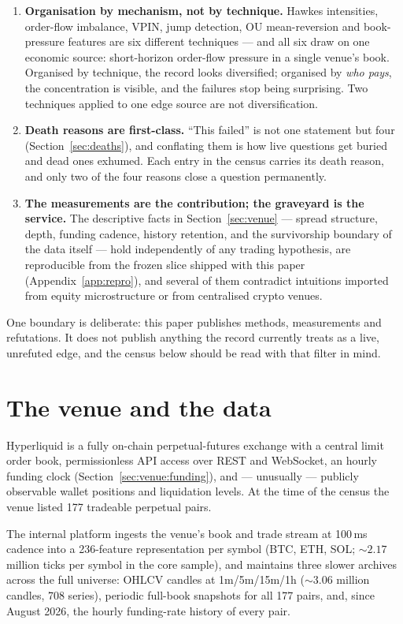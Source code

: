 \documentclass[11pt,a4paper]{article}
\begin{document}
\begin{enumerate}
\item \textbf{Organisation by mechanism, not by technique.} Hawkes
intensities, order-flow imbalance, VPIN, jump detection, OU
mean-reversion and book-pressure features are six different techniques
--- and all six draw on one economic source: short-horizon order-flow
pressure in a single venue's book. Organised by technique, the record
looks diversified; organised by \emph{who pays}, the concentration is
visible, and the failures stop being surprising. Two techniques applied
to one edge source are not diversification.
\item \textbf{Death reasons are first-class.} ``This failed'' is not
one statement but four (Section~\ref{sec:deaths}), and conflating them
is how live questions get buried and dead ones exhumed. Each entry in
the census carries its death reason, and only two of the four reasons
close a question permanently.
\item \textbf{The measurements are the contribution; the graveyard is
the service.} The descriptive facts in Section~\ref{sec:venue} ---
spread structure, depth, funding cadence, history retention, and the
survivorship boundary of the data itself --- hold independently of any
trading hypothesis, are reproducible from the frozen slice shipped with
this paper (Appendix~\ref{app:repro}), and several of them contradict
intuitions imported from equity microstructure or from centralised
crypto venues.
\end{enumerate}

One boundary is deliberate: this paper publishes methods, measurements
and refutations. It does not publish anything the record currently
treats as a live, unrefuted edge, and the census below should be read
with that filter in mind.

\section{The venue and the data}
\label{sec:data}

Hyperliquid is a fully on-chain perpetual-futures exchange with a
central limit order book, permissionless API access over REST and
WebSocket, an hourly funding clock
(Section~\ref{sec:venue:funding}), and --- unusually ---
publicly observable wallet positions and liquidation levels. At the
time of the census the venue listed 177 tradeable perpetual pairs.

The internal platform ingests the venue's book and trade stream at
100\,ms cadence into a 236-feature representation per symbol (BTC, ETH,
SOL; ${\sim}2.17$ million ticks per symbol in the core sample), and
maintains three slower archives across the full universe: OHLCV candles
at 1m/5m/15m/1h (${\sim}3.06$ million candles, 708 series), periodic
full-book snapshots for all 177 pairs, and, since August 2026, the
hourly funding-rate history of every pair.
\end{document}
